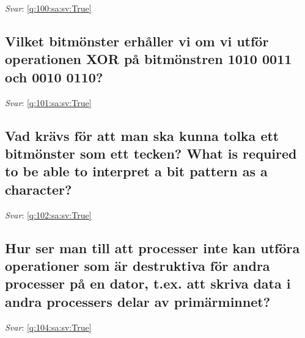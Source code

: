 \documentclass[a4paper,11pt,oneside]{article}
\begin{document}
\begin{sloppypar}
\textit{Svar}: \autoref{q:100:sa:sv:True}



\subsection{Vilket bitm\"onster erh\r{a}ller vi om vi utf\"or operationen XOR p\r{a} bitm\"onstren 1010 0011 och 0010 0110?}

\label{q:101:sa:sv:False}

\vspace{2cm}

\noindent\makebox[\textwidth]{\hrulefill}

\vspace{1cm}

\textit{Svar}: \autoref{q:101:sa:sv:True}



\subsection{Vad kr\"avs f\"or att man ska kunna tolka ett bitm\"onster som ett tecken? What is required to be able to interpret a bit pattern as a character?}

\label{q:102:sa:sv:False}

\vspace{2cm}

\noindent\makebox[\textwidth]{\hrulefill}

\vspace{1cm}

\textit{Svar}: \autoref{q:102:sa:sv:True}



\subsection{Hur ser man till att processer inte kan utf\"ora operationer som \"ar destruktiva f\"or andra processer p\r{a} en dator, t.ex. att skriva data i andra processers delar av prim\"arminnet?}

\label{q:104:sa:sv:False}

\vspace{2cm}

\noindent\makebox[\textwidth]{\hrulefill}

\vspace{1cm}

\textit{Svar}: \autoref{q:104:sa:sv:True}




\end{sloppypar}
\end{document}
